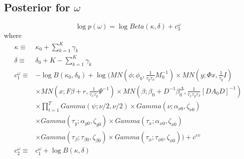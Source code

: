 \documentclass[11pt]{article}
\begin{document}
\subsection{Posterior for $\omega$}
\begin{equation}
	\log p\left(\omega\right)=\log Beta\left(\kappa,\delta\right)+c_{3}^{\omega}
\end{equation}
where
\begin{align*}
	\kappa\equiv&\kappa_{0}+\sum_{k=1}^{K}\gamma_{k}\\\delta\equiv&\delta_{0}+K-\sum_{k=1}^{K}\gamma_{k}\\c_{1}^{\omega}\equiv&-\log B\left(\kappa_{0},\delta_{0}\right)+\log\Bigg(MN\left(\phi;\phi_{0},\frac{1}{\tau_{y}\tau_{\phi}}M_{0}^{-1}\right)\times MN\left(y;\Phi x,\frac{1}{\tau_{y}}I\right)\\&\times MN\left(x;F\beta+r,\frac{1}{\tau_{x}\tau_{y}}\Psi^{-1}\right)\times MN\left(\beta;\beta_{0}+D^{-1}\beta_{0}^{\Delta},\frac{1}{\tau_{x}\tau_{y}\tau_{\beta}}\left[DA_{0}D\right]^{-1}\right)\\&\times\prod_{t=1}^{T}Gamma\left(\psi;\nu/2,\nu/2\right)\times Gamma\left(\nu;\alpha_{\nu0},\zeta_{\nu0}\right)\\&\times Gamma\left(\tau_{y};\alpha_{y0},\zeta_{y0}\right)\times Gamma\left(\tau_{x};\alpha_{x0},\zeta_{x0}\right)\\&\times Gamma\left(\tau_{\beta};\tau_{\beta0},\zeta_{\beta0}\right)\times Gamma\left(\tau_{\phi};\tau_{\phi0},\zeta_{\phi0}\right)\Bigg)+c^{ev}\\c_{2}^{\omega}\equiv&c_{1}^{\omega}+\log B\left(\kappa,\delta\right)
\end{align*}
\end{document}
